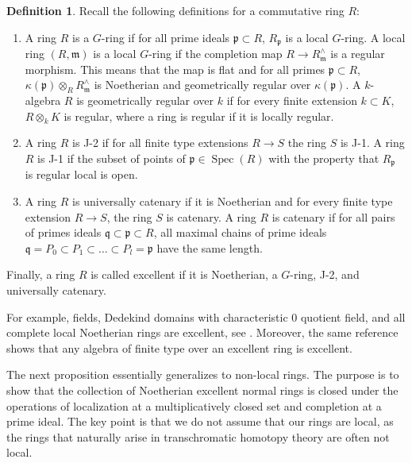 \documentclass[oneside]{amsart}
\theoremstyle{definition}
\newtheorem{defn}[thm]{Definition}
\theoremstyle{remark}
\theoremstyle{theorem}
\numberwithin{equation}{section}
\DeclareMathOperator{\Spec}{Spec}
\newcommand{\fp}{\mathfrak{p}}
\newcommand{\fm}{\mathfrak{m}}
\newcommand{\fq}{\mathfrak{q}}
\begin{document}
\begin{defn}
Recall the following definitions for a commutative ring $R$:
	\begin{enumerate}
		\item A ring $R$ is a $G$-ring if for all prime ideals $\fp \subset R$, $R_{\fp}$ is a local $G$-ring. A local ring $(R,\fm)$ is a local $G$-ring if the completion map $R \rightarrow R^{\wedge}_{\fm}$ is a regular morphism. This means that the map is flat and for all primes $\fp \subset R$, $\kappa(\fp) \otimes_R R^{\wedge}_{\fm}$ is Noetherian and geometrically regular over $\kappa(\fp)$. A $k$-algebra $R$ is geometrically regular over $k$ if for every finite extension $k \subset K$, $R \otimes_k K$ is regular, where a ring is regular if it is locally regular.
		\item A ring $R$ is J-2 if for all finite type extensions $R \rightarrow S$ the ring $S$ is J-1. A ring $R$ is J-1 if the subset of points of $\fp \in \Spec(R)$ with the property that $R_\fp$ is regular local is open.
		\item A ring $R$ is universally catenary if it is Noetherian and for every finite type extension $R \rightarrow S$, the ring $S$ is catenary. A ring $R$ is catenary if for all pairs of primes ideals $\fq \subset \fp \subset R$, all maximal chains of prime ideals $\fq = P_0 \subset P_1 \subset \ldots \subset P_l = \fp$ have the same length.
	\end{enumerate}
Finally, a ring $R$ is called excellent if it is Noetherian, a $G$-ring, J-2, and universally catenary. 
\end{defn}

For example, fields, Dedekind domains with characteristic $0$ quotient field, and all complete local Noetherian rings are excellent, see \cite[Tag 07QW]{stacks-project}. Moreover, the same reference shows that any algebra of finite type over an excellent ring is excellent. 


The next proposition essentially generalizes \cite[Tag 0C23]{stacks-project} to non-local rings. The purpose is to show that the collection of Noetherian excellent normal rings is closed under the operations of localization at a multiplicatively closed set and completion at a prime ideal. The key point is that we do not assume that our rings are local, as the rings that naturally arise in transchromatic homotopy theory are often not local.

\end{document}
